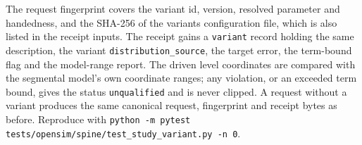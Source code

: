 The request fingerprint covers the variant id, version, resolved parameter and
handedness, and the SHA-256 of the variants configuration file, which is also
listed in the receipt inputs.  The receipt gains a \texttt{variant} record
holding the same description, the variant \texttt{distribution\_source}, the
target error, the term-bound flag and the model-range report.  The driven
level coordinates are compared with the segmental model's own coordinate
ranges; any violation, or an exceeded term bound, gives the status
\texttt{unqualified} and is never clipped.  A request without a variant
produces the same canonical request, fingerprint and receipt bytes as before.
Reproduce with
\texttt{python -m pytest tests/opensim/spine/test\_study\_variant.py -n 0}.
